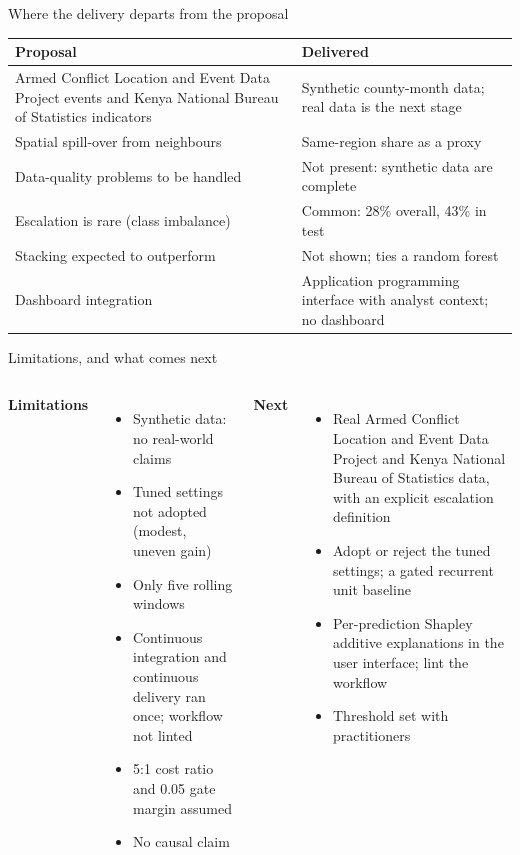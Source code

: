 \documentclass[aspectratio=169,11pt]{beamer}
\begin{document}
\begin{frame}{Where the delivery departs from the proposal}
  \footnotesize
  \begin{tabular}{@{}>{\raggedright\arraybackslash}p{5.3cm}>{\raggedright\arraybackslash}p{7.9cm}@{}}
    \toprule \textbf{Proposal} & \textbf{Delivered} \\ \midrule
    Armed Conflict Location and Event Data Project events and Kenya National Bureau of Statistics indicators & Synthetic county-month data; real data is the next stage \\
    Spatial spill-over from neighbours & Same-region share as a proxy \\
    Data-quality problems to be handled & Not present: synthetic data are complete \\
    Escalation is rare (class imbalance) & Common: 28\% overall, 43\% in test \\
    Stacking expected to outperform & Not shown; ties a random forest \\
    Dashboard integration & Application programming interface with analyst context; no dashboard \\
    \bottomrule
  \end{tabular}
\end{frame}

\begin{frame}{Limitations, and what comes next}
  \begin{columns}[T]
    \textbf{Limitations}
    \begin{itemize}\setlength{\itemsep}{3pt}\small
      \item Synthetic data: no real-world claims
      \item Tuned settings not adopted (modest, uneven gain)
      \item Only five rolling windows
      \item Continuous integration and continuous delivery ran once; workflow not linted
      \item 5:1 cost ratio and 0.05 gate margin assumed
      \item No causal claim
    \end{itemize}
    \textbf{Next}
    \begin{itemize}\setlength{\itemsep}{3pt}\small
      \item Real Armed Conflict Location and Event Data Project and Kenya National Bureau of Statistics data, with an explicit escalation definition
      \item Adopt or reject the tuned settings; a gated recurrent unit baseline
      \item Per-prediction Shapley additive explanations in the user interface; lint the workflow
      \item Threshold set with practitioners
    \end{itemize}
  \end{columns}
\end{frame}
\end{document}
